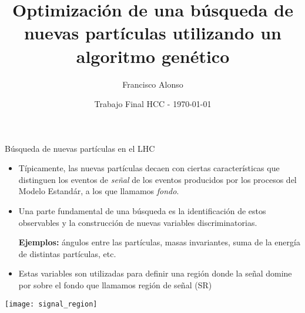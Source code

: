 \documentclass[center,10pt,cm]{beamer}
\title{\bf Optimizaci\'on de una b\'usqueda de nuevas part\'iculas utilizando un algoritmo gen\'etico}
\author{Francisco Alonso}
\institute{}
\date{Trabajo Final HCC - \today}
\begin{document}
\centering

\begin{frame}[plain]
    \titlepage
\end{frame}

\begin{frame}{B\'usqueda de nuevas part\'iculas en el LHC}

  \begin{itemize}\itemsep0.5cm
  \item T\'ipicamente, las nuevas part\'iculas decaen con ciertas caracter\'isticas que distinguen los eventos de \emph{se\~nal}
    de los eventos producidos por los procesos del Modelo Estand\'ar, a los que llamamos \emph{fondo}.

  \item Una parte fundamental de una b\'usqueda es la identificaci\'on de estos observables y la construcci\'on de nuevas
    variables discriminatorias.

    {\small
    \begin{center}
      \textbf{Ejemplos:} \'angulos entre las part\'iculas, masas invariantes, suma de la energ\'ia de distintas part\'iculas, etc.
    \end{center}
    }

  \item Estas variables son utilizadas para definir una regi\'on donde la se\~nal domine por sobre el fondo que llamamos
    regi\'on de se\~nal (SR)

  \end{itemize}

  \begin{minipage}{0.5\textwidth}
    \centering
  \texttt{[image: signal\_region]}
  \end{minipage}%
  \begin{minipage}{0.5\textwidth}
    \centering
  \end{minipage}

\end{frame}
\end{document}
